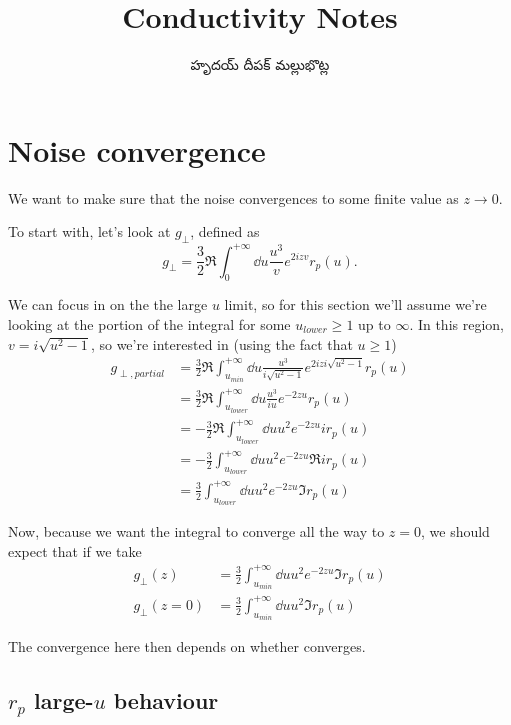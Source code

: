 \documentclass[../main.tex]{subfiles}
\title{Conductivity Notes}
\author{\begin{telugu}హృదయ్ దీపక్ మల్లుభొట్ల\end{telugu}}
\date{}
\begin{document}
	\section{Noise convergence} \label{sec:convergence}

	We want to make sure that the noise convergences to some finite value as $z \rightarrow 0$.

	To start with, let's look at $g_\perp$, defined as
	\begin{equation}
		g_\perp = \frac32 \Re \int_0^{+\infty} \dd{u} \frac{u^3}{v} e^{2 i z v} r_p(u).
	\end{equation}

	We can focus in on the the large $u$ limit, so for this section we'll assume we're looking at the portion of the integral
	for some $u_{lower} \geq 1$ up to $\infty$.
	In this region, $v = i \sqrt{u^2 - 1}$, so we're interested in (using the fact that $u \geq 1$)
	\begin{align}
		g_{\perp,partial} &= \frac32 \Re \int_{u_{min}}^{+\infty} \dd{u} \frac{u^3}{i \sqrt{u^2 - 1}} e^{2 i z i \sqrt{u^2 - 1}} r_p(u) \\
		&= \frac32 \Re \int_{u_{lower}}^{+\infty} \dd{u} \frac{u^3}{i u} e^{-2 z u} r_p(u) \\
		&= - \frac32 \Re \int_{u_{lower}}^{+\infty} \dd{u} u^2 e^{-2 z u} i r_p(u) \\
		&= - \frac32 \int_{u_{lower}}^{+\infty} \dd{u} u^2 e^{-2 z u} \Re{i r_p(u)} \\
		&= \frac32 \int_{u_{lower}}^{+\infty} \dd{u} u^2 e^{-2 z u} \Im r_p(u)
	\end{align}

	Now, because we want the integral to converge all the way to $z = 0$, we should expect that if we take
	\begin{align}
		g_\perp(z) &= \frac32 \int_{u_{min}}^{+\infty} \dd{u} u^2 e^{-2 z u} \Im r_p(u) \\
		g_\perp(z = 0) &= \frac32 \int_{u_{min}}^{+\infty} \dd{u} u^2 \Im r_p(u) \label{eq:gperpsimplest}
	\end{align}

	The convergence here then depends on whether  converges.

	\subsection{$r_p$ large-$u$ behaviour} \label{subsec:largeurpbehav}
\end{document}
